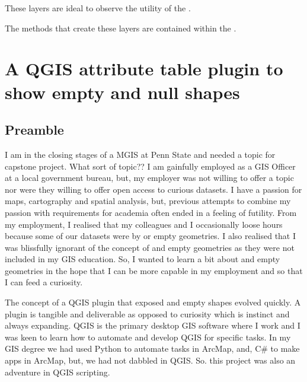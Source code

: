 \documentclass[letterpaper,11pt,english]{sphinxmanual}
\begin{document}
These layers are ideal to observe the utility of the {\hyperref[\detokenize{pluginTools/geomAttribute:geometryattributetable-page}]{}}.

The methods that create these layers are contained within the {\hyperref[\detokenize{API:modelvectorlayers-api}]{}}.


\chapter{A QGIS attribute table plugin to show empty and null shapes}
\label{\detokenize{concept:a-qgis-attribute-table-plugin-to-show-empty-and-null-shapes}}\label{\detokenize{concept:concept-page}}\label{\detokenize{concept::doc}}


\section{Preamble}
\label{\detokenize{concept:preamble}}
I am in the closing stages of a MGIS at Penn State and needed a topic for capstone project.  What sort of topic?? I am gainfully employed as a GIS Officer at a local government bureau, but, my employer was not willing to offer a topic nor were they willing to offer open access to curious datasets.  I have a passion for maps, cartography and spatial analysis, but, previous attempts to combine my passion with requirements for academia often ended in a feeling of futility.  From my employment, I realised that my colleagues and I occasionally loose hours because some of our datasets were  by  or empty geometries.  I also realised that I was blissfully ignorant of the concept of  and empty geometries as they were not included in my GIS education.  So, I wanted to learn a bit about  and empty geometries in the hope that I can be more capable in my employment and so that I can feed a curiosity.

The concept of a QGIS plugin that exposed  and empty shapes evolved quickly.  A plugin is tangible and deliverable as opposed to curiosity which is instinct and always expanding.  QGIS is the primary desktop GIS software where I work and I was keen to learn how to automate and develop QGIS for specific tasks.  In my GIS degree we had used Python to automate tasks in ArcMap, and, C\# to make apps in ArcMap, but, we had not dabbled in QGIS.  So. this project was also an adventure in QGIS scripting.
\end{document}
